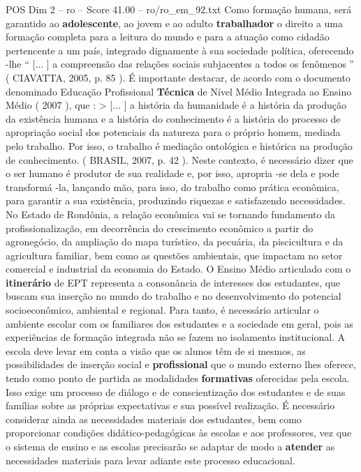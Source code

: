 \begin{textsample}{POS Dim 2 – ro – Score 41.00 – ro/ro\_em\_92.txt}
Como formação humana, será garantido ao \textbf{adolescente}, ao jovem e ao adulto \textbf{trabalhador} o direito a uma formação completa para a leitura do mundo e para a atuação como cidadão pertencente a um país, integrado dignamente à sua sociedade política, oferecendo -lhe “ [... ] a compreensão das relações sociais subjacentes a todos os fenômenos ” ( CIAVATTA, 2005, p. 85 ).
É importante destacar, de acordo com o documento denominado Educação Profissional \textbf{Técnica} de Nível Médio Integrada ao Ensino Médio ( 2007 ), que : > [... ] a história da humanidade é a história da produção da existência humana e a história do conhecimento é a história do processo de apropriação social dos potenciais da natureza para o próprio homem, mediada pelo trabalho.
Por isso, o trabalho é mediação ontológica e histórica na produção de conhecimento. ( BRASIL, 2007, p. 42 ).
Neste contexto, é necessário dizer que o ser humano é produtor de sua realidade e, por isso, apropria -se dela e pode transformá -la, lançando mão, para isso, do trabalho como prática econômica, para garantir a sua existência, produzindo riquezas e satisfazendo necessidades.
No Estado de Rondônia, a relação econômica vai se tornando fundamento da profissionalização, em decorrência do crescimento econômico a partir do agronegócio, da ampliação do mapa turístico, da pecuária, da piscicultura e da agricultura familiar, bem como as questões ambientais, que impactam no setor comercial e industrial da economia do Estado.
O Ensino Médio articulado com o \textbf{itinerário} de EPT representa a consonância de interesses dos estudantes, que buscam sua inserção no mundo do trabalho e no desenvolvimento do potencial socioeconômico, ambiental e regional.
Para tanto, é necessário articular o ambiente escolar com os familiares dos estudantes e a sociedade em geral, pois as experiências de formação integrada não se fazem no isolamento institucional.
A escola deve levar em conta a visão que os alunos têm de si mesmos, as possibilidades de inserção social e \textbf{profissional} que o mundo externo lhes oferece, tendo como ponto de partida as modalidades \textbf{formativas} oferecidas pela escola.
Isso exige um processo de diálogo e de conscientização dos estudantes e de suas famílias sobre as próprias expectativas e sua possível realização.
É necessário considerar ainda as necessidades materiais dos estudantes, bem como proporcionar condições didático-pedagógicas às escolas e aos professores, vez que o sistema de ensino e as escolas precisarão se adaptar de modo a \textbf{atender} as necessidades materiais para levar adiante este processo educacional.

\end{textsample}
